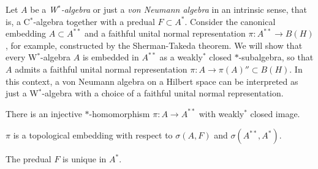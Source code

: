 \documentclass{../../large}
\begin{document}
\begin{prb}
Let $A$ be a \emph{W$^*$-algebra} or just a \emph{von Neumann algebra} in an intrinsic sense, that is, a C$^*$-algebra together with a predual $F\subset A^*$.
Consider the canonical embedding $A\subset A^{**}$ and a faithful unital normal representation $\pi:A^{**}\to B(H)$, for example, constructed by the Sherman-Takeda theorem.
We will show that every W$^*$-algebra $A$ is embedded in $A^{**}$ as a weakly$^*$ closed $*$-subalgebra, so that $A$ admits a faithful unital normal representation $\pi:A\to \pi(A)''\subset B(H)$.
In this context, a von Neumann algebra on a Hilbert space can be interpreted as just a W$^*$-algebra with a choice of a faithful unital normal representation.
\begin{parts}
\item There is an injective $*$-homomorphism $\pi:A\to A^{**}$ with weakly$^*$ closed image.
\item $\pi$ is a topological embedding with respect to $\sigma(A,F)$ and $\sigma(A^{**},A^*)$.
\item The predual $F$ is unique in $A^*$.
\end{parts}
\end{prb}
\end{document}
